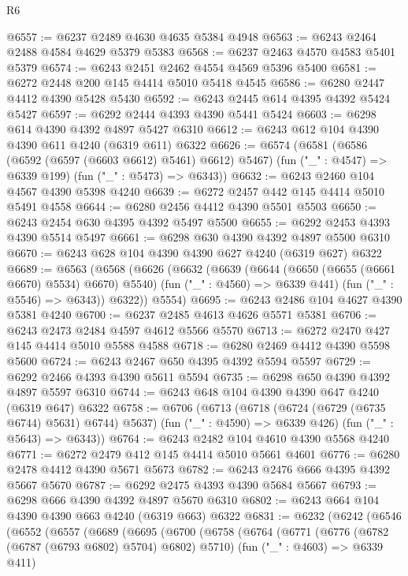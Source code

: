 \begin{lexlean}{R6}
\begin{coremodule}
@6557 := @6237 @2489 @4630 @4635 @5384 @4948
@6563 := @6243 @2464 @2488 @4584 @4629 @5379 @5383
@6568 := @6237 @2463 @4570 @4583 @5401 @5379
@6574 := @6243 @2451 @2462 @4554 @4569 @5396 @5400
@6581 := @6272 @2448 @200 @145 @4414 @5010 @5418 @4545
@6586 := @6280 @2447 @4412 @4390 @5428 @5430
@6592 := @6243 @2445 @614 @4395 @4392 @5424 @5427
@6597 := @6292 @2444 @4393 @4390 @5441 @5424
@6603 := @6298 @614 @4390 @4392 @4897 @5427 @6310
@6612 := @6243 @612 @104 @4390 @4390 @611 @4240 (@6319 @611) @6322
@6626 := @6574
    (@6581
      (@6586 (@6592 (@6597 (@6603 @6612) @5461) @6612) @5467)
      (fun ("_" : @4547) => @6339 @199)
      (fun ("_" : @5473) => @6343))
@6632 := @6243 @2460 @104 @4567 @4390 @5398 @4240
@6639 := @6272 @2457 @442 @145 @4414 @5010 @5491 @4558
@6644 := @6280 @2456 @4412 @4390 @5501 @5503
@6650 := @6243 @2454 @630 @4395 @4392 @5497 @5500
@6655 := @6292 @2453 @4393 @4390 @5514 @5497
@6661 := @6298 @630 @4390 @4392 @4897 @5500 @6310
@6670 := @6243 @628 @104 @4390 @4390 @627 @4240 (@6319 @627) @6322
@6689 := @6563
    (@6568
      (@6626
        (@6632
          (@6639
            (@6644 (@6650 (@6655 (@6661 @6670) @5534) @6670) @5540)
            (fun ("_" : @4560) => @6339 @441)
            (fun ("_" : @5546) => @6343))
          @6322))
      @5554)
@6695 := @6243 @2486 @104 @4627 @4390 @5381 @4240
@6700 := @6237 @2485 @4613 @4626 @5571 @5381
@6706 := @6243 @2473 @2484 @4597 @4612 @5566 @5570
@6713 := @6272 @2470 @427 @145 @4414 @5010 @5588 @4588
@6718 := @6280 @2469 @4412 @4390 @5598 @5600
@6724 := @6243 @2467 @650 @4395 @4392 @5594 @5597
@6729 := @6292 @2466 @4393 @4390 @5611 @5594
@6735 := @6298 @650 @4390 @4392 @4897 @5597 @6310
@6744 := @6243 @648 @104 @4390 @4390 @647 @4240 (@6319 @647) @6322
@6758 := @6706
    (@6713
      (@6718 (@6724 (@6729 (@6735 @6744) @5631) @6744) @5637)
      (fun ("_" : @4590) => @6339 @426)
      (fun ("_" : @5643) => @6343))
@6764 := @6243 @2482 @104 @4610 @4390 @5568 @4240
@6771 := @6272 @2479 @412 @145 @4414 @5010 @5661 @4601
@6776 := @6280 @2478 @4412 @4390 @5671 @5673
@6782 := @6243 @2476 @666 @4395 @4392 @5667 @5670
@6787 := @6292 @2475 @4393 @4390 @5684 @5667
@6793 := @6298 @666 @4390 @4392 @4897 @5670 @6310
@6802 := @6243 @664 @104 @4390 @4390 @663 @4240 (@6319 @663) @6322
@6831 := @6232
    (@6242
      (@6546
        (@6552
          (@6557
            (@6689
              (@6695
                (@6700
                  (@6758
                    (@6764
                      (@6771
                        (@6776 (@6782 (@6787 (@6793 @6802) @5704) @6802) @5710)
                        (fun ("_" : @4603) => @6339 @411)

\end{coremodule}
\end{lexlean}
